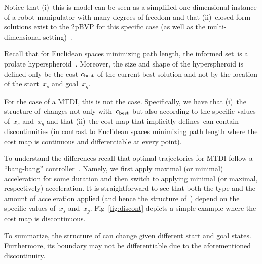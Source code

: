\documentclass[letterpaper, 10 pt, conference]{ieeeconf}  %
\begin{document}
Notice that 
(i)~this is model can be seen as a simplified one-dimensional instance of a robot manipulator with many degrees of freedom and that
(ii)~closed-form solutions exist to the 2pBVP for this specific case (as well as the multi-dimensional setting)~\cite{HN10, KS14}.

Recall that for Euclidean spaces minimizing path length, the informed set~\Cinf is a prolate hyperspheroid~\cite{GSB14}.
Moreover, the size and shape of the hyperspheroid is defined only be the cost $c_{\rm best}$ of the current best solution and not by the location of the start~$x_s$ and goal~$x_g$.

For the case of a MTDI, this is not the case. 
Specifically, we have that 
(i)~the structure of~\Cinf changes not only with~$c_{\rm best}$ but also according to the specific values of~$x_s$ and~$x_g$ 
and that
(ii)~the cost map that implicitly defines~\Cinf can contain discontinuities (in contrast to Euclidean spaces minimizing path length where the cost map is continuous and differentiable at every point).

To understand the differences recall that optimal trajectories  for MTDI follow a ``bang-bang'' controller~\cite{HN10, KS14}.
Namely, we first apply maximal (or minimal) acceleration for some duration and then switch to applying minimal (or maximal, respectively) acceleration.
It is straightforward to see that both the type and the amount of acceleration applied (and hence the structure of~\Cinf) depend on the specific values of~$x_s$ and~$x_g$. 
Fig~\ref{fig:discont} depicts a simple example where the cost map is discontinuous.

To summarize, the structure of \Cinf can change given different start and goal states.
Furthermore,  its boundary may not be  differentiable due to the aforementioned discontinuity.
\end{document}
